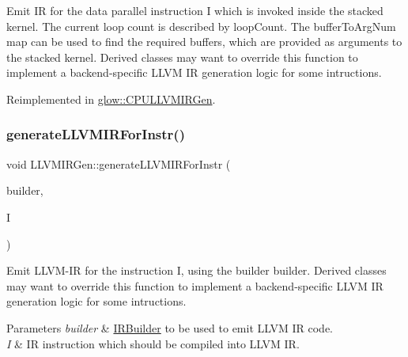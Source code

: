 Emit IR for the data parallel instruction {\ttfamily I} which is invoked inside the stacked {\ttfamily kernel}. The current loop count is described by {\ttfamily loop\+Count}. The {\ttfamily buffer\+To\+Arg\+Num} map can be used to find the required buffers, which are provided as arguments to the stacked {\ttfamily kernel}. Derived classes may want to override this function to implement a backend-\/specific L\+L\+VM IR generation logic for some intructions. 

Reimplemented in \hyperlink{classglow_1_1_c_p_u_l_l_v_m_i_r_gen_adbc69b398e182458dc67c93c3357b606}{glow\+::\+C\+P\+U\+L\+L\+V\+M\+I\+R\+Gen}.

\mbox{\label{classglow_1_1_l_l_v_m_i_r_gen_a8b36e4f70a5e436f3b29e54303ad1401}} 
\subsubsection{\texorpdfstring{generate\+L\+L\+V\+M\+I\+R\+For\+Instr()}{generateLLVMIRForInstr()}}
{\footnotesize\ttfamily void L\+L\+V\+M\+I\+R\+Gen\+::generate\+L\+L\+V\+M\+I\+R\+For\+Instr (\begin{DoxyParamCaption}\item[{llvm\+::\+I\+R\+Builder$<$$>$ \&}]{builder,  }\item[{const \hyperlink{classglow_1_1_instruction}{glow\+::\+Instruction} $\ast$}]{I }\end{DoxyParamCaption})\hspace{0.3cm}{\ttfamily [virtual]}}

Emit L\+L\+V\+M-\/\+IR for the instruction {\ttfamily I}, using the builder {\ttfamily builder}. Derived classes may want to override this function to implement a backend-\/specific L\+L\+VM IR generation logic for some intructions. 
\begin{DoxyParams}{Parameters}
{\em builder} & \hyperlink{classglow_1_1_i_r_builder}{I\+R\+Builder} to be used to emit L\+L\+VM IR code. \\
\hline
{\em I} & IR instruction which should be compiled into L\+L\+VM IR. \\
\hline
\end{DoxyParams}


